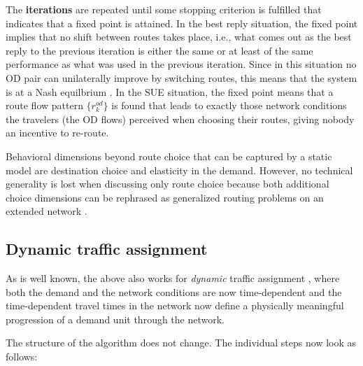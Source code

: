 The \textbf{iterations} are repeated until some stopping criterion is
fulfilled that indicates that a fixed point is attained.
In the best reply situation, the fixed point implies that no shift
between routes takes place, i.e., what comes out as the best reply to
the previous iteration is either the same or at least of the same
performance as what was used in the previous iteration.
Since in this situation no OD pair can unilaterally improve
by switching routes, this means that the system is at a Nash
equilbrium \citep[e.g.,][]{HofbSigmBook}.
In the SUE situation, the fixed point means that a route flow pattern 
$\{r^{od}_k\}$ is found that leads to exactly those network conditions the
travelers (the OD flows) perceived when choosing their routes,
giving nobody an incentive to re-route.

Behavioral dimensions beyond route choice that can be captured by a
static model are destination choice and elasticity in the
demand. However, no technical generality is lost when discussing only
route choice because both additional choice dimensions can be
rephrased as generalized routing problems on an extended network
\citep[``supernetwork''; see, e.g.,][]{sheffi-1985,NagurneyEtcSupernetworks}. 


\subsection{Dynamic traffic assignment}

As is well known, the above also works for \emph{dynamic} traffic
assignment \citep[DTA; see][]{peeta-2001}, where both the demand and the network conditions are now time-dependent and the time-dependent travel times in the network now define a physically meaningful progression of a demand unit through the network. 

The structure of the algorithm does not change. The individual steps now look as follows:


